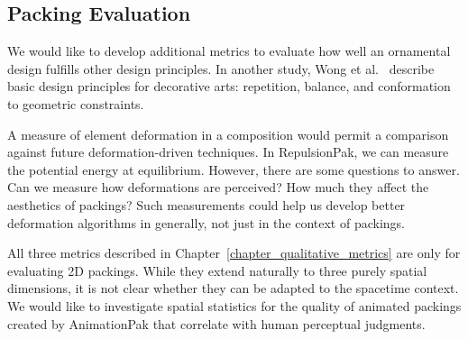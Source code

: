 \subsection{Packing Evaluation}

We would like to develop additional metrics to evaluate
how well an ornamental design fulfills other design principles.
In another study, Wong et al.~\cite{Wong1998} describe basic design
principles for decorative arts: repetition, balance, and conformation
to geometric constraints. 

A measure of element deformation in a composition would permit 
a comparison against future deformation-driven techniques.
In RepulsionPak, we can measure the potential energy at equilibrium.
However, there are some questions to answer.
Can we measure how deformations are perceived? How much they affect the aesthetics of packings?
Such measurements could help us develop better deformation algorithms in generally, not just in the context of packings.

All three metrics described in Chapter~\ref{chapter_qualitative_metrics} are only for evaluating 2D packings.
While they extend naturally to three purely spatial dimensions, 
it is not clear whether they can be adapted to the spacetime context.  
We would like to investigate spatial statistics for the quality of animated packings created by AnimationPak that correlate
with human perceptual judgments.

